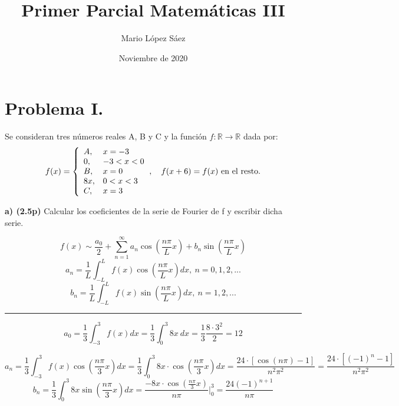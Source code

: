 \documentclass{article}
\begin{document}
\title{Primer Parcial Matemáticas III}
\author{Mario López Sáez}
\date{Noviembre de 2020}
\maketitle

\begin{center}

\end{center}
\section*{Problema I.} Se consideran tres números reales A, B y C y la función $f:\mathbb{R} \to \mathbb{R}$ dada por:
$$
f(x)={\left\{\begin{array}{l l}{A,}&{x=-3}\\ {0,}&{-3<x<0}\\ {B,}&{x=0}\\ {8x,}&{0<x<3}\\ {C,}&{x=3}\end{array}\right.},\quad f(x+6)=f(x){\mathrm{~en~el~resto}}.
$$
\begin{flushleft}
\textbf{a) (2.5p)} Calcular los coeficientes de la serie de Fourier de f y escribir dicha serie.
\end{flushleft}			
$$
f(x)\sim\frac{a_{0}}{2}+\sum_{n=1}^{\infty}a_{n}\cos\left(\frac{n\pi}{L}x\right)+b_{n}\sin\left(\frac{n\pi}{L}x\right)
$$
$$
a_{n} = \frac{1}{L} \int_{-L}^L f(x) \cos (\frac{n \pi}{L}x) dx, \ n = 0,1,2,...
$$
$$
b_{n} = \frac{1}{L} \int_{-L}^L f(x) \sin (\frac{n \pi}{L}x) dx, \ n = 1,2,...
$$
\hrule 
\vspace{0.3cm}
$$
a_{0} = \frac{1}{3} \int_{-3}^3 f(x)dx = \frac{1}{3} \int_{0}^{3} 8x \ dx = \frac{1}{3} \frac{8 \cdot 3^2}{2} = 12
$$

$$
a_{n} = \frac{1}{3} \int_{-3}^{3} f(x) \cos (\frac{n \pi}{3}x)dx = \frac{1}{3} \int_{0}^{3} 8x \cdot \cos (\frac{n \pi}{3}x) dx = \frac{24 \cdot [\cos(n \pi) - 1]}{n^{2}\pi^2} = \frac{24 \cdot [(-1)^n - 1]}{n^{2} \pi^2}
$$
$$
b_{n} = \frac{1}{3} \int_{0}^{3} 8x \sin (\frac{n \pi}{3}x) dx = \frac{-8x \cdot \cos (\frac{n \pi}{3}x)}{n \pi} \Bigg|_0^3 = \frac{24 (-1)^{n+1}}{n \pi}
$$
\end{document}
